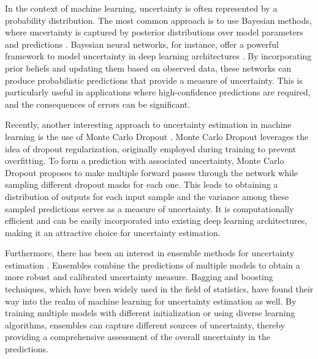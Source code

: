 In the context of machine learning, uncertainty is often represented by a probability distribution. The most common approach is to use Bayesian methods, where uncertainty is captured by posterior distributions over model parameters and predictions \cite{gelman_bayesian_2013}. Bayesian neural networks, for instance, offer a powerful framework to model uncertainty in deep learning architectures \cite{neal_bayesian_1995}. By incorporating prior beliefs and updating them based on observed data, these networks can produce probabilistic predictions that provide a measure of uncertainty. This is particularly useful in applications where high-confidence predictions are required, and the consequences of errors can be significant.

Recently, another interesting approach to uncertainty estimation in machine learning is the use of Monte Carlo Dropout \cite{gal_dropout_2016}. Monte Carlo Dropout leverages the idea of dropout regularization, originally employed during training to prevent overfitting. To form a prediction with associated uncertainty, Monte Carlo Dropout proposes to make multiple forward passes through the network while sampling different dropout masks for each one. This leads to obtaining a distribution of outputs for each input sample and the variance among these sampled predictions serves as a measure of uncertainty. It is computationally efficient and can be easily incorporated into existing deep learning architectures, making it an attractive choice for uncertainty estimation.

Furthermore, there has been an interest in ensemble methods for uncertainty estimation \cite{lakshminarayanan_simple_2017}. Ensembles combine the predictions of multiple models to obtain a more robust and calibrated uncertainty measure. Bagging and boosting techniques, which have been widely used in the field of statistics, have found their way into the realm of machine learning for uncertainty estimation as well. By training multiple models with different initialization or using diverse learning algorithms, ensembles can capture different sources of uncertainty, thereby providing a comprehensive assessment of the overall uncertainty in the predictions.

